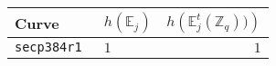 \documentclass[11pt,fleqn]{article}
\newcommand{\BbbZ}{\mathbb{Z}}
\newcommand{\BbbE}{\mathbb{E}}
\newcommand{\Ejt}{\ensuremath{\BbbE^t_j(\BbbZ_q))} }
\newcommand{\Ej}{\ensuremath{\BbbE_j} }
\begin{document}
\begin{tabularx}{\textwidth}{llR}
\textbf{Curve}            &$h(\Ej)$ & $h(\Ejt)$ \\
\hline
\texttt{\footnotesize secp384r1     }& $\scriptstyle 1  $    & $\scriptstyle 1                                                                                        $\\

\end{tabularx}
\end{document}
